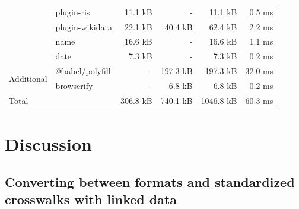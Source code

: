 \documentclass[fleqn,10pt,lineno]{wlpeerj} %
\begin{document}
\begin{table}[bt!]
\begin{tabular}{|l|l|r|r|r|r|}
                                 & plugin-ris        & 11.1 kB                           & -                                          & 11.1 kB                             & 0.5 ms                                                      \\ \cline{2-6} 
                                 & plugin-wikidata   & 22.1 kB                           & 40.4 kB                                    & 62.4 kB                             & 2.2 ms                                                      \\ \cline{2-6} 
                                 & name              & 16.6 kB                           & -                                          & 16.6 kB                             & 1.1 ms                                                      \\ \cline{2-6} 
                                 & date              & 7.3 kB                            & -                                          & 7.3 kB                              & 0.2 ms                                                      \\ \hline
\multirow{2}{*}{Additional}      & @babel/polyfill   & -                                 & 197.3 kB                                   & 197.3 kB                            & 32.0 ms                                                     \\ \cline{2-6} 
                                 & browserify        & -                                 & 6.8 kB                                     & 6.8 kB                              & 0.2 ms                                                      \\ \hline
\multicolumn{2}{|l|}{Total}                          & 306.8 kB                          & 740.1 kB                                   & 1046.8 kB                           & 60.3 ms                                                     \\ \hline
\end{tabular}
\end{table}

\section*{Discussion}

\subsection*{Converting between formats and standardized crosswalks with linked data}
\end{document}
